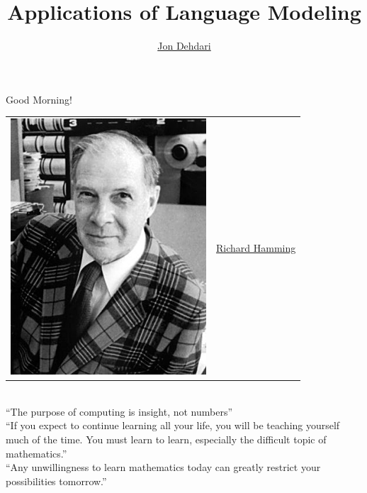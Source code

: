 \documentclass[xcolor=pdftex,x11names,table,hyperref]{beamer}
\begin{document}
\title{Applications of Language Modeling \\[1.5em]
 }
\author{\href{http://jon.dehdari.org}{Jon Dehdari}}
\frame{\titlepage}

\begin{frame}{Good Morning!}
	\begin{tabular}{ll}
		\parbox[c]{6.5em}{\includegraphics[width=0.28\textheight]{images/Richard_Hamming_from_Wikipedia.jpg} } & \hspace*{1.0em} {\Large \href{https://en.wikipedia.org/wiki/Richard_Hamming}{Richard Hamming}}
	\end{tabular} \\[1.6em]
		``The purpose of computing is insight, not numbers''\\[1.4em]
		\pause
		``If you expect to continue learning all your life, you will be teaching yourself much of the time. You must learn to learn, especially the difficult topic of mathematics.'' \\[1.4em]
		\pause
		``Any unwillingness to learn mathematics today can greatly restrict your possibilities tomorrow.''
\end{frame}
\end{document}
